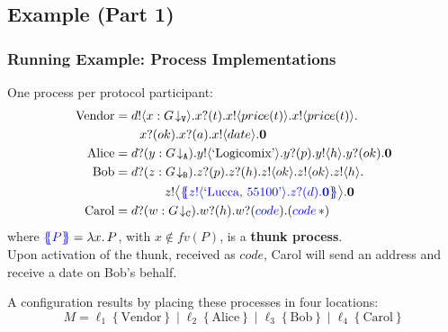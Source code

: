 \documentclass[12pt]{beamer}
\newcommand{\pS}{\ensuremath{\mathtt{V}}\xspace}
\newcommand{\blrangle}[1]{\big\langle #1 \big\rangle}
\newcommand{\abs}[2]{\lambda #1.\,#2}
\newcommand{\outses}{!}
\newcommand{\inpses}{?}
\newcommand{\tproj}[2]{#1\!\downarrow_{#2}}
\newcommand{\Par}{\;|\;}
\newcommand{\freev}[1]{\langle #1\rangle}
\newcommand{\boundv}[1]{(#1)}
\newcommand{\shsep}{.}
\newcommand{\appl}[2]{#1\, {#2}}
\newcommand{\bout}[2]{#1 \outses \freev{#2} \shsep}
\newcommand{\bbout}[2]{#1 \outses \blrangle{#2} \shsep}
\newcommand{\binp}[2]{#1 \inpses \boundv{#2} \shsep}
\newcommand{\myloc}[2]{#1\left\{#2\right\}}
\newcommand{\loc}{\ell}
\newcommand{\inact}{\mathbf{0}}
\newcommand{\pA}{\ensuremath{\mathtt{A}}\xspace}
\newcommand{\pB}{\ensuremath{\mathtt{B}}\xspace}
\newcommand{\pC}{\ensuremath{\mathtt{C}}\xspace}
\newcommand{\exBook}{\text{`Logicomix'}}
\newcommand{\thunkp}[1]{\ensuremath\{\!\!\{#1\}\!\!\}}
\newcommand{\dummyn}{\ensuremath{\ast}}
\begin{document}
\subsection{Example (Part 1)}
\begin{frame}
\frametitle{Running Example: Process Implementations}

One process per protocol participant:
\begin{align*}
\text{Vendor} & =  \bout{d}{x:\tproj{G}{\pS}}\binp{x}{t}\bout{x}{price(t)}\bout{x}{price(t)}\\
& \qquad \binp{x}{ok}\binp{x}{a} \bout{x}{date}\inact  
\\
\text{Alice} & =  \binp{d}{y:\tproj{G}{\pA}}\bout{y}{\exBook}\binp{y}{p}\bout{y}{h}\binp{y}{ok}\inact  
\\
\text{Bob} & =  \binp{d}{z:\tproj{G}{\pB}}\binp{z}{p}\binp{z}{h}\bout{z}{ok}\bout{z}{ok}\bout{z}{h}
  \\
  & \qquad \qquad \bbout{z}{\textcolor{blue}{\thunkp{\bout{z}{\text{`Lucca, 55100'}}\binp{z}{d}\inact}}}\inact
  \\
\text{Carol} & =  \binp{d}{w:\tproj{G}{\pC}}\binp{w}{h}\binp{w}{\textcolor{blue}{code}}(\appl{\textcolor{blue}{code}}{\dummyn})
\end{align*}
where $\textcolor{blue}{\thunkp{P}}=\abs{x}{P}$, with $x \not \in fv(P)$, is a \textbf{thunk process}. \\
Upon activation of the thunk, received as $code$, Carol will send an address and receive a date on Bob's behalf.

\bigskip

A configuration results by placing these processes in four locations:
	$$M = \myloc{\loc_1}{\text{Vendor}} 
\Par
\myloc{\loc_2}{\text{Alice}} 
\Par
\myloc{\loc_3}{\text{Bob}} 
\Par 
\myloc{\loc_4}{\text{Carol}} 
$$
\end{frame}
\end{document}
